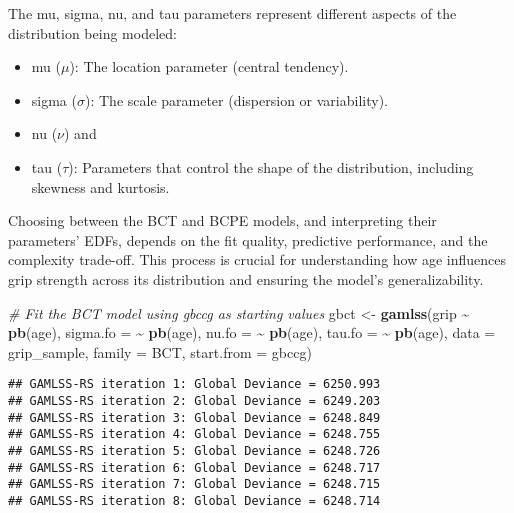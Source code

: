 \documentclass[
]{article}
\newenvironment{Shaded}{\begin{snugshade}}{\end{snugshade}}
\newcommand{\AttributeTok}[1]{\textcolor[rgb]{0.13,0.29,0.53}{#1}}
\newcommand{\CommentTok}[1]{\textcolor[rgb]{0.56,0.35,0.01}{\textit{#1}}}
\newcommand{\FunctionTok}[1]{\textcolor[rgb]{0.13,0.29,0.53}{\textbf{#1}}}
\newcommand{\NormalTok}[1]{#1}
\newcommand{\OtherTok}[1]{\textcolor[rgb]{0.56,0.35,0.01}{#1}}
\newcommand{\SpecialCharTok}[1]{\textcolor[rgb]{0.81,0.36,0.00}{\textbf{#1}}}
\providecommand{\tightlist}{%
  \setlength{\itemsep}{0pt}\setlength{\parskip}{0pt}}
\begin{document}
The mu, sigma, nu, and tau parameters represent different aspects of the
distribution being modeled:

\begin{itemize}
\tightlist
\item
  mu (\(\mu\)): The location parameter (central tendency).
\item
  sigma (\(\sigma\)): The scale parameter (dispersion or variability).
\item
  nu (\(\nu\)) and
\item
  tau (\(\tau\)): Parameters that control the shape of the distribution,
  including skewness and kurtosis.
\end{itemize}

Choosing between the BCT and BCPE models, and interpreting their
parameters' EDFs, depends on the fit quality, predictive performance,
and the complexity trade-off. This process is crucial for understanding
how age influences grip strength across its distribution and ensuring
the model's generalizability.

\begin{Shaded}
\begin{Highlighting}[]
\CommentTok{\# Fit the BCT model using gbccg as starting values}
\NormalTok{gbct }\OtherTok{\textless{}{-}} \FunctionTok{gamlss}\NormalTok{(grip }\SpecialCharTok{\textasciitilde{}} \FunctionTok{pb}\NormalTok{(age),}
               \AttributeTok{sigma.fo =} \SpecialCharTok{\textasciitilde{}} \FunctionTok{pb}\NormalTok{(age),}
               \AttributeTok{nu.fo =} \SpecialCharTok{\textasciitilde{}} \FunctionTok{pb}\NormalTok{(age),}
               \AttributeTok{tau.fo =} \SpecialCharTok{\textasciitilde{}} \FunctionTok{pb}\NormalTok{(age),}
               \AttributeTok{data =}\NormalTok{ grip\_sample,}
               \AttributeTok{family =}\NormalTok{ BCT,}
               \AttributeTok{start.from =}\NormalTok{ gbccg)}
\end{Highlighting}
\end{Shaded}

\begin{verbatim}
## GAMLSS-RS iteration 1: Global Deviance = 6250.993 
## GAMLSS-RS iteration 2: Global Deviance = 6249.203 
## GAMLSS-RS iteration 3: Global Deviance = 6248.849 
## GAMLSS-RS iteration 4: Global Deviance = 6248.755 
## GAMLSS-RS iteration 5: Global Deviance = 6248.726 
## GAMLSS-RS iteration 6: Global Deviance = 6248.717 
## GAMLSS-RS iteration 7: Global Deviance = 6248.715 
## GAMLSS-RS iteration 8: Global Deviance = 6248.714
\end{verbatim}
\end{document}
